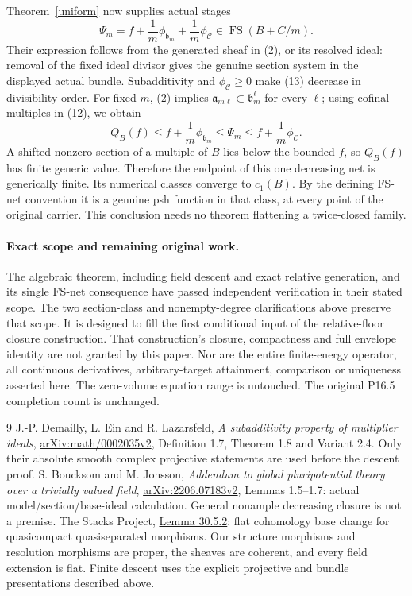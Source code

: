 \documentclass[10pt]{article}
\newcommand{\FS}{\operatorname{FS}}
\begin{document}
Theorem~\ref{uniform} now supplies actual stages
\[
 \Psi_m=f+\frac1m\phi_{\mathfrak b_m}
                 +\frac1m\phi_{\mathcal C}
                  \in\FS(B+C/m).                       \tag{13}
\]
Their expression follows from the generated sheaf in (2), or its
resolved ideal: removal of the fixed ideal divisor gives the genuine
section system in the displayed actual bundle. Subadditivity and
$\phi_{\mathcal C}\geq0$ make (13) decrease in divisibility order.
For fixed $m$, (2) implies
$\mathfrak a_{m\ell}\subset\mathfrak b_m^\ell$ for every $\ell$;
using cofinal multiples in (12), we obtain
\[
 Q_B(f)\leq f+\frac1m\phi_{\mathfrak b_m}
           \leq\Psi_m\leq f+\frac1m\phi_{\mathcal C}.    \tag{14}
\]
A shifted nonzero section of a multiple of $B$ lies below the bounded
$f$, so $Q_B(f)$ has finite generic value. Therefore the endpoint of
this one decreasing net is generically finite. Its numerical classes
converge to $c_1(B)$. By the defining FS-net convention it is a genuine
psh function in that class, at every point of the original carrier.
This conclusion needs no theorem flattening a twice-closed family.

\paragraph{Exact scope and remaining original work.}
The algebraic theorem, including field descent and exact relative
generation, and its single FS-net consequence have passed independent
verification in their stated scope. The two section-class and nonempty-degree
clarifications above preserve that scope. It is designed to fill the first conditional input of
the relative-floor closure construction. That construction's closure,
compactness and full envelope identity are not granted by this paper.
Nor are the entire finite-energy operator, all continuous derivatives,
arbitrary-target attainment, comparison or uniqueness asserted here.
The zero-volume equation range is untouched. The original P16.5
completion count is unchanged.

\begin{thebibliography}{9}
 J.-P. Demailly, L. Ein and R. Lazarsfeld,
\emph{A subadditivity property of multiplier ideals},
\href{https://arxiv.org/html/math/0002035v2}{arXiv:math/0002035v2},
Definition 1.7, Theorem 1.8 and Variant 2.4. Only their absolute smooth
complex projective statements are used before the descent proof.
 S. Boucksom and M. Jonsson,
\emph{Addendum to global pluripotential theory over a trivially valued field},
\href{https://arxiv.org/pdf/2206.07183v2}{arXiv:2206.07183v2},
Lemmas 1.5--1.7: actual model/section/base-ideal calculation.
General nonample decreasing closure is not a premise.
 The Stacks Project,
\href{https://stacks.math.columbia.edu/tag/02KH}{Lemma 30.5.2}:
flat cohomology base change for quasicompact quasiseparated morphisms.
Our structure morphisms and resolution morphisms are proper, the
sheaves are coherent, and every field extension is flat. Finite descent
uses the explicit projective and bundle presentations described above.
\end{thebibliography}
\end{document}
